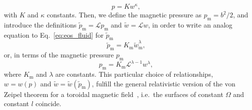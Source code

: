 \documentclass{aa}
\begin{document}
\begin{equation}\label{eq:eos_fluid}
p = K w^{\kappa},
\end{equation}
with $K$ and $\kappa$ constants.
Then, we define the magnetic pressure as $p_{\mathrm{m}} = b^2/2$, and introduce the definitions $\tilde{p}_{\mathrm{m}} = \mathcal{L} p_{\mathrm{m}}$ and $\tilde{w} = \mathcal{L} w$, in order to write an analog equation to Eq.~\eqref{eq:eos_fluid} for $\tilde{p}_{\mathrm{m}}$~\citep{Komissarov:2006}
\begin{equation}\label{eq:eos_mag_tilde}
\tilde{p}_{\mathrm{m}} = K_{\mathrm{m}} \tilde{w}_{\mathrm{m}}^{\lambda
},
\end{equation}
or, in terms of the magnetic pressure $p_{\mathrm{m}}$
\begin{equation}\label{eq:eos_mag}
p_{\mathrm{m}} = K_{\mathrm{m}} \mathcal{L}^{\lambda
-1} w^{\lambda
},
\end{equation}
where $K_{\mathrm{m}}$ and $\lambda
$ are constants.
This particular choice of relationships, $w = w(p)$ and $\tilde{w} = \tilde{w}(\tilde{p}_{\mathrm{m}})$, fulfill the general relativistic version of the von Zeipel theorem for a toroidal magnetic field~\citep{vonZeipel:1924, Zanotti:2015}, i.e.~the surfaces of constant $\Omega$ and constant $l$ coincide.
\end{document}
